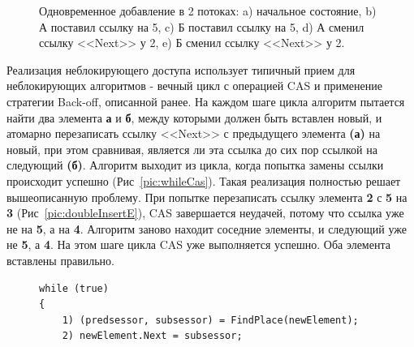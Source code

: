 \documentclass[12pt]{report}
\begin{document}
{\begin{figure}[h!]
\begin{minipage}[h]{0.45\linewidth}
{					\label{pic:doubleInsertD}
				}
			\end{minipage}
			\begin{minipage}[h]{0.45\linewidth}
				\center {}
			\end{minipage}
			\caption{Одновременное добавление в 2 потоках: a) начальное состояние, b) А поставил ссылку на 5, c) Б поставил ссылку на 5, d) А сменил ссылку <<Next>> у 2, e) Б сменил ссылку <<Next>> у 2.}
		\end{figure}
		\par Реализация неблокирующего доступа использует типичный прием для неблокирующих алгоритмов - вечный цикл с операцией CAS и применение стратегии Back-off, описанной ранее. На каждом шаге цикла алгоритм пытается найти два элемента \textbf{а} и \textbf{б}, между которыми должен быть вставлен новый, и атомарно перезаписать ссылку <<Next>> с предыдущего элемента \textbf{(а)} на новый, при этом сравнивая, является ли эта ссылка до сих пор ссылкой на следующий \textbf{(б)}. Алгоритм выходит из цикла, когда попытка замены ссылки происходит успешно (Рис~\ref{pic:whileCas}). Такая реализация полностью решает вышеописанную проблему. При попытке перезаписать ссылку элемента \textbf{2} с \textbf{5} на \textbf{3}  (Рис~\ref{pic:doubleInsertE}), CAS завершается неудачей, потому что ссылка уже не на \textbf{5}, а на \textbf{4}. Алгоритм заново находит соседние элементы, и следующий уже не \textbf{5}, а \textbf{4}. На этом шаге цикла CAS уже выполняется успешно. Оба элемента вставлены правильно.
		\begin{figure}[h]
			\begin{lstlisting}
while (true)
{	
	1) (predsessor, subsessor) = FindPlace(newElement);
	2) newElement.Next = subsessor;

\end{lstlisting}
\end{figure}}
\end{document}
